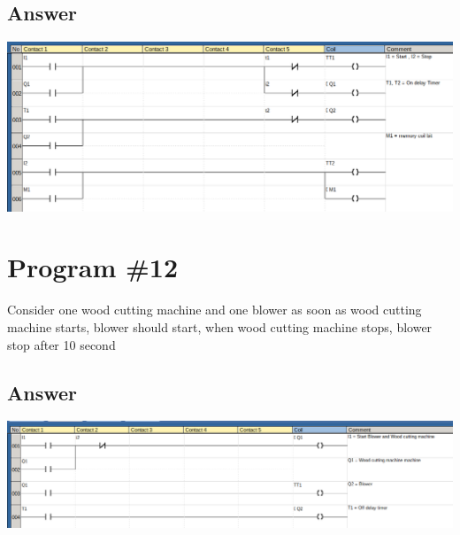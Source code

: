 \documentclass[
	12pt, %
]{fphw}
\begin{document}
\subsection*{Answer}
\begin{center}
  \includegraphics[width=165mm, scale=0.80]{prg13.png}
\end{center}


\section*{Program \#12}
 \begin{problem}
  Consider one wood cutting machine and one blower as soon as wood cutting
  machine starts, blower should start, when wood cutting machine stops, blower
  stop after 10 second
   \medskip
 \end{problem}
\subsection*{Answer}
 \begin{center}
  \includegraphics[width=165mm, scale=0.80]{prg14.png}
 \end{center}
\end{document}
